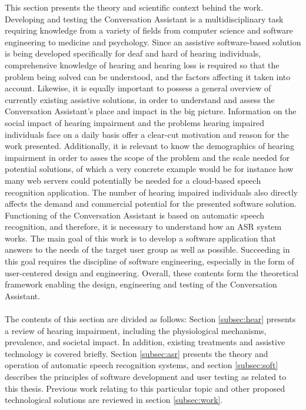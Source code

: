 \documentclass[english, 12pt, a4paper, pdftex, elec, utf8]{aaltothesis}
\begin{document}
This section presents the theory and scientific context behind the work. Developing and testing the Conversation Assistant is a multidisciplinary task requiring knowledge from a variety of fields from computer science and software engineering to medicine and psychology. Since an assistive software-based solution is being developed specifically for deaf and hard of hearing individuals, comprehensive knowledge of hearing and hearing loss is required so that the problem being solved can be understood, and the factors affecting it taken into account. Likewise, it is equally important to possess a general overview of currently existing assistive solutions, in order to understand and assess the Conversation Assistant's place and impact in the big picture. Information on the social impact of hearing impairment and the problems hearing impaired individuals face on a daily basis offer a clear-cut motivation and reason for the work presented. Additionally, it is relevant to know the demographics of hearing impairment in order to asses the scope of the problem and the scale needed for potential solutions, of which a very concrete example would be for instance how many web servers could potentially be needed for a cloud-based speech recognition application. The number of hearing impaired individuals also directly affects the demand and commercial potential for the presented software solution. Functioning of the Conversation Assistant is based on automatic speech recognition, and therefore, it is necessary to understand how an ASR system works. The main goal of this work is to develop a software application that answers to the needs of the target user group as well as possible. Succeeding in this goal requires the discipline of software engineering, especially in the form of user-centered design and engineering. Overall, these contents form the theoretical framework enabling the design, engineering and testing of the Conversation Assistant. \\\\
The contents of this section are divided as follows: Section \ref{subsec:hear} presents a review of hearing impairment, including the physiological mechanisms, prevalence, and societal impact. In addition, existing treatments and assistive technology is covered briefly. Section \ref{subsec:asr} presents the theory and operation of automatic speech recognition systems, and section \ref{subsec:soft} describes the principles of software development and user testing as related to this thesis. Previous work relating to this particular topic and other proposed technological solutions are reviewed in section \ref{subsec:work}.
\end{document}
